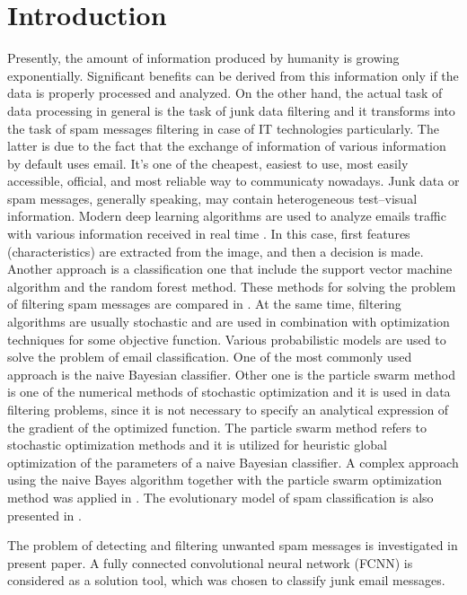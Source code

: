 \documentclass[12pt]{jpconf}
\begin{document}
\section{Introduction}
Presently, the amount of information produced by humanity
is growing exponentially. Significant benefits can be derived from this information only if the data is properly processed and analyzed.
On the other hand, the actual task of data processing in general is the task of junk data filtering and it transforms into the task of spam messages filtering in case of IT technologies particularly.
The latter is due to the fact that the exchange of information of various information by default uses email. It's one of the cheapest, easiest to use, most easily accessible, official, and most reliable way to communicaty nowadays.
Junk data or spam messages, generally speaking, may contain heterogeneous test--visual information. Modern deep
learning algorithms are used to analyze emails traffic with various information received in real time \cite{Makkar2021}.
In this case, first features (characteristics) are extracted from the image, and then a decision is made.
Another approach is a classification one that include the support vector machine algorithm and the random forest method. These methods for solving the problem of filtering spam messages are compared in \cite{Taylor2020}.
At the same time, filtering algorithms are usually stochastic \cite{Garg2021} and are used in combination with optimization techniques for some objective function. Various probabilistic models are used to solve the problem of email classification. One of the most commonly used approach is the naive Bayesian classifier. Other one is the particle swarm method is one of the numerical methods of stochastic optimization and it is used in data filtering problems, since it is not necessary to specify an analytical expression of the gradient of the optimized function. The particle swarm method refers to stochastic optimization methods and it is utilized for heuristic global optimization of the parameters of a naive Bayesian classifier. A complex approach using the naive Bayes algorithm together with the particle swarm optimization method was applied in \cite{Parmar2020}.
The evolutionary model of spam classification is also presented in \cite{Mohammad2020}.

The problem of detecting and filtering unwanted spam messages is investigated in present paper. A fully connected convolutional neural network ({FCNN}) is considered as a solution tool, which was chosen to classify junk email messages.
\end{document}
